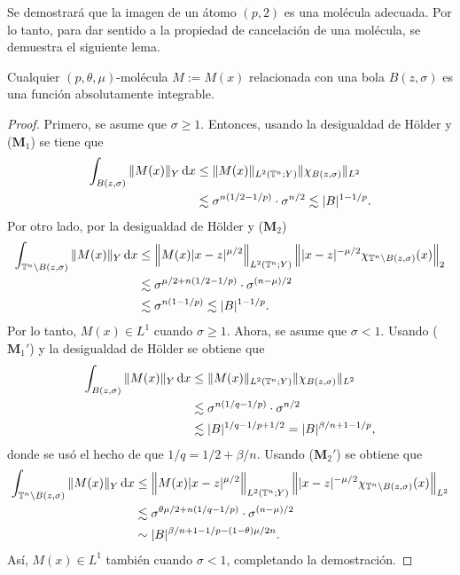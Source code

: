 Se demostrará que la imagen de un átomo $(p, 2)$ es una molécula adecuada. Por lo tanto, para dar sentido a la propiedad de cancelación de una molécula, se demuestra el siguiente lema.
\begin{lemma}
	Cualquier $(p,\theta,\mu)$-molécula $M:=M(x)$ relacionada con una bola $B(z, \sigma)$ es una función absolutamente integrable.
\end{lemma}
\begin{proof}
	Primero, se asume que $\sigma\geq1$. Entonces, usando la desigualdad de H\"older y ($\mathbf{M}_1$) se tiene que
	\begin{align*}
		\int_{B(z,\sigma)}\|M(x)\|_Y \mathop{}\!\mathrm{d} x  &\leq  \|M(x)\|_{L^2(\mathbb{T}^n;Y)} \|\chi_{B(z,\sigma)}\|_{L^2} \\
		 & \lesssim \sigma^{n(1/2-1/p)}\cdot \sigma^{n/2} \lesssim |B|^{1-1/p}.
	\end{align*}
	Por otro lado, por la desigualdad de H\"older y ($\mathbf{M}_2$)
	\begin{align*}
		\int_{\mathbb{T}^n\setminus B(z,\sigma)}\|M(x)\|_Y\mathop{}\!\mathrm{d} x  &\leq  \left\|M(x)|x-z|^{\mu/2} \right\|_{L^2(\mathbb{T}^n;Y)} \left\| |x-z|^{-\mu/2} \chi_{\mathbb{T}^n\setminus B(z,\sigma)}(x) \right\|_2 \\
		 & \lesssim \sigma^{\mu/2 + n(1/2-1/p)} \cdot\sigma^{(n-\mu)/2} \\
		 & \lesssim \sigma^{n(1-1/p)} \lesssim |B|^{1-1/p}.
	\end{align*}
	Por lo tanto, $M(x) \in L^1$ cuando $\sigma \geq 1$. Ahora, se asume que $\sigma < 1$. Usando ($\mathbf{M}_1'$) y la desigualdad de H\"older se obtiene que
	\begin{align*}
		\int_{B(z,\sigma)}\|M(x)\|_Y \mathop{}\!\mathrm{d} x  &\leq 
		\|M(x)\|_{L^2(\mathbb{T}^n;Y)}\|\chi_{B(z,\sigma)}\|_{L^2} \\
		 & \lesssim \sigma^{n(1/q - 1/p)} \cdot \sigma^{n/2}\\  
		 & \lesssim |B|^{1/q-1/p+1/2} = |B|^{\beta/n+1-1/p},
	\end{align*}
	donde se usó el hecho de que $1/q=1/2+\beta/n$. Usando ($\mathbf{M}_2'$) se obtiene que
	\begin{align*}
		\int_{\mathbb{T}^n\setminus B(z,\sigma)}\|M(x)\|_Y\mathop{}\!\mathrm{d} x  &\leq  \left\|M(x)|x-z|^{\mu/2} \right\|_{L^2(\mathbb{T}^n;Y)} \left\| |x-z|^{-\mu/2} \chi_{\mathbb{T}^n\setminus B(z,\sigma)}(x) \right\|_{L^2} \\
		 & \lesssim \sigma^{\theta\mu/2+n(1/q-1/p)} \cdot\sigma^{(n-\mu)/2} \\
		 & \sim |B|^{\beta/n+1-1/p-(1-\theta)\mu/2n}.
	\end{align*}
	Así, $M(x) \in L^1$ también cuando $\sigma<1$, completando la demostración.
\end{proof}
